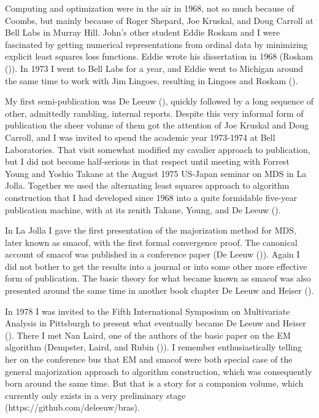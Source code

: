 \documentclass[
  12pt,
  letterpaper,
  DIV=11,
  numbers=noendperiod]{scrartcl}
\begin{document}
Computing and optimization were in the air in 1968, not so much because
of Coombs, but mainly because of Roger Shepard, Joe Kruskal, and Doug
Carroll at Bell Labs in Murray Hill. John's other student Eddie Roskam
and I were fascinated by getting numerical representations from ordinal
data by minimizing explicit least squares loss functions. Eddie wrote
his dissertation in 1968 (Roskam ()). In
1973 I went to Bell Labs for a year, and Eddie went to Michigan around
the same time to work with Jim Lingoes, resulting in Lingoes and Roskam
().

My first semi-publication was De Leeuw
(), quickly followed by a long
sequence of other, admittedly rambling, internal reports. Despite this
very informal form of publication the sheer volume of them got the
attention of Joe Kruskal and Doug Carroll, and I was invited to spend
the academic year 1973-1974 at Bell Laboratories. That visit somewhat
modified my cavalier approach to publication, but I did not become
half-serious in that respect until meeting with Forrest Young and Yoshio
Takane at the August 1975 US-Japan seminar on MDS in La Jolla. Together
we used the alternating least squares approach to algorithm construction
that I had developed since 1968 into a quite formidable five-year
publication machine, with at its zenith Takane, Young, and De Leeuw
().

In La Jolla I gave the first presentation of the majorization method for
MDS, later known as smacof, with the first formal convergence proof. The
canonical account of smacof was published in a conference paper (De
Leeuw ()). Again I did not bother to
get the results into a journal or into some other more effective form of
publication. The basic theory for what became known as smacof was also
presented around the same time in another book chapter De Leeuw and
Heiser ().

In 1978 I was invited to the Fifth International Symposium on
Multivariate Analysis in Pittsburgh to present what eventually became De
Leeuw and Heiser (). There I met
Nan Laird, one of the authors of the basic paper on the EM algorithm
(Dempster, Laird, and Rubin
()). I remember
enthusiastically telling her on the conference bus that EM and smacof
were both special case of the general majorization approach to algorithm
construction, which was consequently born around the same time. But that
is a story for a companion volume, which currently only exists in a very
preliminary stage (https://github.com/deleeuw/bras).
\end{document}
